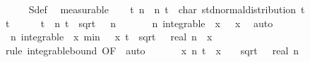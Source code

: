 \documentclass{svjour3}
\begin{document}
{\begin{isabellebody}
\ \ \ \ \isamarkupfalse%
\ S{\isacharunderscore}def\ \isamarkupfalse%
\ measurable\isanewline
\ \ \isamarkupfalse%
\ {\isachardoublequoteopen}{\isasymAnd}t{\isachardot}\ {\isacharparenleft}{\isasymlambda}n{\isachardot}\ {\isasymphi}\ n\ t{\isacharparenright}\ {\isacharminus}{\isacharminus}{\isacharminus}{\isacharminus}{\isachargreater}\ char\ std{\isacharunderscore}normal{\isacharunderscore}distribution\ t{\isachardoublequoteclose}\isanewline
\ \ \isamarkupfalse%
\ {\isacharminus}\isanewline
\ \ \ \ \isamarkupfalse%
\ t\isanewline
\ \ \ \ \isamarkupfalse%
\ {\isacharquery}t\ {\isacharequal}\ {\isachardoublequoteopen}{\isasymlambda}n{\isachardot}\ t\ {\isacharslash}\ sqrt\ {\isacharparenleft}{\isasymsigma}\ {\isacharasterisk}\ n{\isacharparenright}{\isachardoublequoteclose}\isanewline
\ \ \ \ \isamarkupfalse%
\ {\isacharasterisk}{\isacharcolon}\ {\isachardoublequoteopen}{\isasymAnd}n{\isachardot}\ integrable\ {\isasymmu}\ {\isacharparenleft}{\isasymlambda}x{\isachardot}\ {}\ {\isacharasterisk}\ x{\isacharcircum}{}{\isacharparenright}{\isachardoublequoteclose}\ \isamarkupfalse%
\ auto\isanewline
\ \ \ \ \isamarkupfalse%
\ {\isacharasterisk}{\isacharasterisk}{\isacharcolon}\ {\isachardoublequoteopen}{\isasymAnd}n{\isachardot}\ integrable\ {\isasymmu}\ {\isacharparenleft}{\isasymlambda}x{\isachardot}\ min\ {\isacharparenleft}{}\ {\isacharasterisk}\ x\ {\isacharparenleft}{\isasymbar}t\ {\isacharslash}\ sqrt\ {\isacharparenleft}{\isasymsigma}\ {\isacharasterisk}\ real\ n{\isacharparenright}{\isasymbar}\ {\isacharasterisk}\ {\isasymbar}x{\isasymbar}\ {\isacharcircum}\ {}{\isacharparenright}{\isacharparenright}{\isachardoublequoteclose}\isanewline
\ \ \ \ \ \ \isamarkupfalse%
\ {\isacharparenleft}rule\ integrable{\isacharunderscore}bound\ {\isacharbrackleft}OF\ {\isacharasterisk}{\isacharbrackright}{\isacharparenright}\ auto\isanewline
\ \ \ \ \isamarkupfalse%
\ {\isacharasterisk}{\isacharasterisk}{\isacharasterisk}{\isacharcolon}\ {\isachardoublequoteopen}{\isasymAnd}x{\isachardot}\ {\isacharparenleft}{\isasymlambda}n{\isachardot}\ {\isasymbar}t{\isasymbar}\ {\isacharasterisk}\ {\isasymbar}x{\isasymbar}\ {\isacharcircum}\ {}\ {\isacharslash}\ {\isasymbar}sqrt\ {\isacharparenleft}{\isasymsigma}\ {\isacharasterisk}\ real\ n{\isacharparenright}{\isasymbar}{\isacharparenright}\ {\isacharminus}{\isacharminus}{\isacharminus}{\isacharminus}{\isachargreater}\ {}{\isachardoublequoteclose}\isanewline

\end{isabellebody}}
\end{document}
